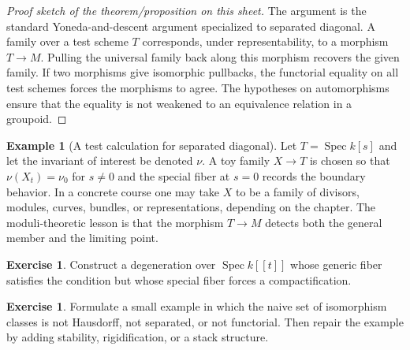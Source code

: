 \documentclass[11pt]{amsart}
\theoremstyle{definition}
\newtheorem{example}[theorem]{Example}
\newtheorem{exercise}[theorem]{Exercise}
\newcommand{\Spec}{\operatorname{Spec}}
\begin{document}
\begin{proof}[Proof sketch of the theorem/proposition on this sheet]
The argument is the standard Yoneda-and-descent argument specialized to separated diagonal.  A family over a test scheme $T$ corresponds, under representability, to a morphism $T\to M$.  Pulling the universal family back along this morphism recovers the given family.  If two morphisms give isomorphic pullbacks, the functorial equality on all test schemes forces the morphisms to agree.  The hypotheses on automorphisms ensure that the equality is not weakened to an equivalence relation in a groupoid.
\end{proof}
\begin{example}[A test calculation for separated diagonal]
Let $T=\Spec k[s]$ and let the invariant of interest be denoted $\nu$.  A toy family $X\to T$ is chosen so that $\nu(X_t)=\nu_0$ for $s\ne0$ and the special fiber at $s=0$ records the boundary behavior.  In a concrete course one may take $X$ to be a family of divisors, modules, curves, bundles, or representations, depending on the chapter.  The moduli-theoretic lesson is that the morphism $T\to M$ detects both the general member and the limiting point.
\end{example}
\begin{exercise}
Construct a degeneration over $\Spec k[[t]]$ whose generic fiber satisfies the condition but whose special fiber forces a compactification.
\end{exercise}
\begin{exercise}
Formulate a small example in which the naive set of isomorphism classes is not Hausdorff, not separated, or not functorial.  Then repair the example by adding stability, rigidification, or a stack structure.
\end{exercise}
\clearpage
\end{document}
